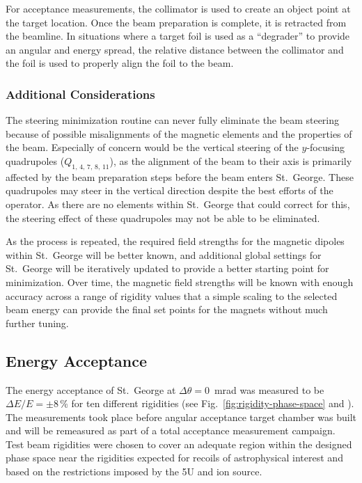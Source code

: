 For acceptance measurements, the collimator is used to create an object
point at the target location. Once the beam preparation is complete, it
is retracted from the beamline. In situations where a target foil is
used as a ``degrader'' to provide an angular and energy spread, the
relative distance between the collimator and the foil is used to
properly align the foil to the beam.

\subsubsection{Additional Considerations}
The steering minimization routine can never fully eliminate the beam
steering because of possible misalignments of the magnetic elements and
the properties of the beam. Especially of concern would be the vertical
steering of the $y$-focusing quadrupoles ($Q_{1,\,4,\,7,\,8,\,11}$), as
the alignment of the beam to their axis is primarily affected by the
beam preparation steps before the beam enters St.\ George. These
quadrupoles may steer in the vertical direction despite the best efforts
of the operator. As there are no elements within St.\ George that could
correct for this, the steering effect of these quadrupoles may not be
able to be eliminated.

As the process is repeated, the required field strengths for the
magnetic dipoles within St.\ George will be better known, and additional
global settings for St.\ George will be iteratively updated to provide a
better starting point for minimization. Over time, the magnetic field
strengths will be known with enough accuracy across a range of rigidity
values that a simple scaling to the selected beam energy can provide the
final set points for the magnets without much further tuning.

\subsection{Energy Acceptance}

The energy acceptance of St.\ George at $\Delta\theta = 0$~mrad was
measured to be $\Delta E/E = \pm 8$\,\% for ten different rigidities
(see Fig.~\ref{fig:rigidity-phase-space} and \cite{Meisel2017}). The
measurements took place before angular acceptance target chamber was
built and will be remeasured as part of a total acceptance measurement
campaign. Test beam rigidities were chosen to cover an adequate region
within the designed phase space near the rigidities expected for recoils
of astrophysical interest and based on the restrictions imposed by the
5U and ion source.


